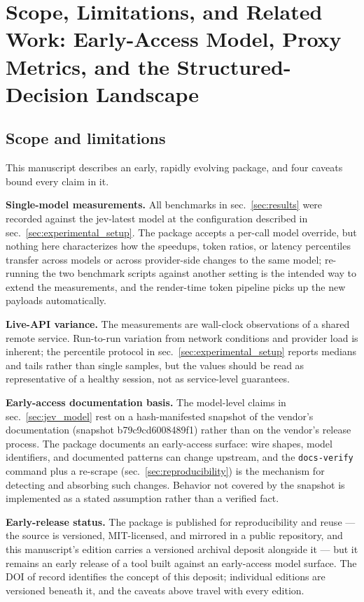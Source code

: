 \documentclass[
  english,
]{article}
\begin{document}
\newpage

\section{Scope, Limitations, and Related Work: Early-Access Model, Proxy
Metrics, and the Structured-Decision Landscape}\label{sec:scope}

\subsection{Scope and limitations}\label{scope-and-limitations}

This manuscript describes an early, rapidly evolving package, and four
caveats bound every claim in it.

\textbf{Single-model measurements.} All benchmarks in
sec.~\ref{sec:results} were recorded against the jev-latest model at the
configuration described in sec.~\ref{sec:experimental_setup}. The
package accepts a per-call model override, but nothing here
characterizes how the speedups, token ratios, or latency percentiles
transfer across models or across provider-side changes to the same
model; re-running the two benchmark scripts against another setting is
the intended way to extend the measurements, and the render-time token
pipeline picks up the new payloads automatically.

\textbf{Live-API variance.} The measurements are wall-clock observations
of a shared remote service. Run-to-run variation from network conditions
and provider load is inherent; the percentile protocol in
sec.~\ref{sec:experimental_setup} reports medians and tails rather than
single samples, but the values should be read as representative of a
healthy session, not as service-level guarantees.

\textbf{Early-access documentation basis.} The model-level claims in
sec.~\ref{sec:jev_model} rest on a hash-manifested snapshot of the
vendor's documentation (snapshot b79c9cd6008489f1) rather than on the
vendor's release process. The package documents an early-access surface:
wire shapes, model identifiers, and documented patterns can change
upstream, and the \texttt{docs-verify} command plus a re-scrape
(sec.~\ref{sec:reproducibility}) is the mechanism for detecting and
absorbing such changes. Behavior not covered by the snapshot is
implemented as a stated assumption rather than a verified fact.

\textbf{Early-release status.} The package is published for
reproducibility and reuse --- the source is versioned, MIT-licensed, and
mirrored in a public repository, and this manuscript's edition carries a
versioned archival deposit alongside it --- but it remains an early
release of a tool built against an early-access model surface. The DOI
of record identifies the concept of this deposit; individual editions
are versioned beneath it, and the caveats above travel with every
edition.
\end{document}
